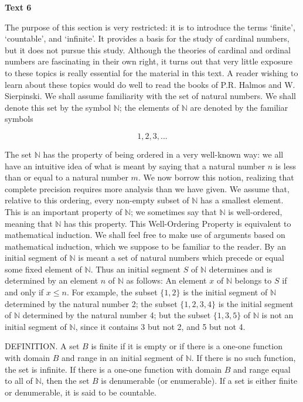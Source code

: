 \documentclass[a4paper]{article}
\newcommand{\ESect}[1]{\medskip\par{\large \textbf{#1}}\par}
\begin{document}
\ESect{Text 6}
The purpose of this section is very restricted: it is to introduce the terms `finite', `countable', and `infinite'. It provides
a basis for the study of cardinal numbers, but it does not pursue this study. Although the theories of cardinal and ordinal numbers
are fascinating in their own right, it turns out that very little exposure to these topics is really essential for the material
in this text. A reader wishing to learn about these topics would do well to read the books of P.R. Halmos and W. Sierpinski.
We shall assume familiarity with the set of natural numbers. We shall denote this set by the symbol $\mathbb{N}$; the elements
of $\mathbb{N}$ are denoted by the familiar symbols

$$1,2,3,...$$

The set $\mathbb{N}$ has the property of being ordered in a very well-known way: we all have an intuitive idea of what is meant
by saying that a natural number $n$ is less than or equal to a natural number $m$. We now borrow this notion, realizing that
complete precision requires more analysis than we have given. We assume that, relative to this ordering, every non-empty subset
of $\mathbb{N}$ has a smallest element. This is an important property of $\mathbb{N}$; we sometimes say that $\mathbb{N}$ is
well-ordered, meaning that $\mathbb{N}$ has this property. This Well-Ordering Property is equivalent to mathematical induction.
We shall feel free to make use of arguments based on mathematical induction, which we suppose to be familiar to the reader.
By an initial segment of $\mathbb{N}$ is meant a set of natural numbers which precede or equal some fixed element of $\mathbb{N}$.
Thus an initial segment $S$ of $\mathbb{N}$ determines and is determined by an element $n$ of $\mathbb{N}$ as follows:
An element $x$ of $\mathbb{N}$ belongs to $S$ if and only if $x \leqslant n$. For example, the subset $\{1,2\}$ is the initial
segment of $\mathbb{N}$ determined by the natural number 2; the subset $\{1, 2, 3, 4\}$ is the initial segment of $\mathbb{N}$
determined by the natural number 4; but the subset $\{1,3,5\}$ of $\mathbb{N}$ is not an initial segment of $\mathbb{N}$, since
it contains 3 but not 2, and 5 but not 4.

DEFINITION. A set $B$ is finite if it is empty or if there is a one-one function with domain $B$ and range in an initial segment
of $\mathbb{N}$. If there is no such function, the set is infinite. If there is a one-one function with domain $B$ and range equal
to all of $\mathbb{N}$, then the set $B$ is denumerable (or enumerable). If a set is either finite or denumerable, it is said to
be countable.
\end{document}
